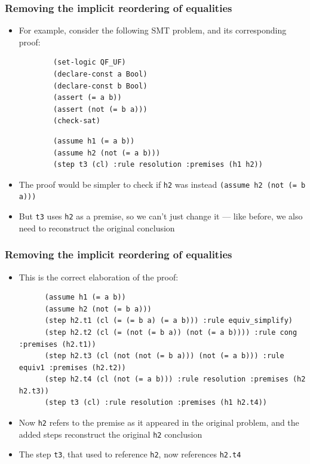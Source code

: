 \documentclass[usepdftitle=false,aspectratio=169]{beamer}
\newcommand\vitem{\vfill\item}
\begin{document}
\begin{frame}[fragile]
  \frametitle{Removing the implicit reordering of equalities}
  \begin{itemize}
    \item For example, consider the following SMT problem, and its corresponding
    proof:
    \begin{minipage}[t]{0.35 \textwidth}
      \begin{verbatim}
        (set-logic QF_UF)
        (declare-const a Bool)
        (declare-const b Bool)
        (assert (= a b))
        (assert (not (= b a)))
        (check-sat)
      \end{verbatim}
    \end{minipage}
    \hfill
    \begin{minipage}[t]{0.6 \textwidth}
      \begin{verbatim}
        (assume h1 (= a b))
        (assume h2 (not (= a b)))
        (step t3 (cl) :rule resolution :premises (h1 h2))
      \end{verbatim}
    \end{minipage}
    \vitem The proof would be simpler to check if \texttt{h2} was instead
    \texttt{(assume h2 (not (= b a)))}
    \vitem But \texttt{t3} uses \texttt{h2} as a premise, so we can't just
    change it --- like before, we also need to reconstruct the original
    conclusion
  \end{itemize}
\end{frame}

\begin{frame}[fragile]
  \frametitle{Removing the implicit reordering of equalities}
  \begin{itemize}
    \begin{verbatim}
      (assume h1 (= a b))
      (assume h2 (not (= a b)))
      (step t3 (cl) :rule resolution :premises (h1 h2))
    \end{verbatim}
    \vitem This is the correct elaboration of the proof:
    \begin{verbatim}
      (assume h1 (= a b))
      (assume h2 (not (= b a)))
      (step h2.t1 (cl (= (= b a) (= a b))) :rule equiv_simplify)
      (step h2.t2 (cl (= (not (= b a)) (not (= a b)))) :rule cong :premises (h2.t1))
      (step h2.t3 (cl (not (not (= b a))) (not (= a b))) :rule equiv1 :premises (h2.t2))
      (step h2.t4 (cl (not (= a b))) :rule resolution :premises (h2 h2.t3))
      (step t3 (cl) :rule resolution :premises (h1 h2.t4))
    \end{verbatim}
    \vitem Now \texttt{h2} refers to the premise as it appeared in the original
    problem, and the added steps reconstruct the original \texttt{h2} conclusion
    \vitem The step \texttt{t3}, that used to reference \texttt{h2}, now
    references \texttt{h2.t4}
  \end{itemize}
\end{frame}
\end{document}
